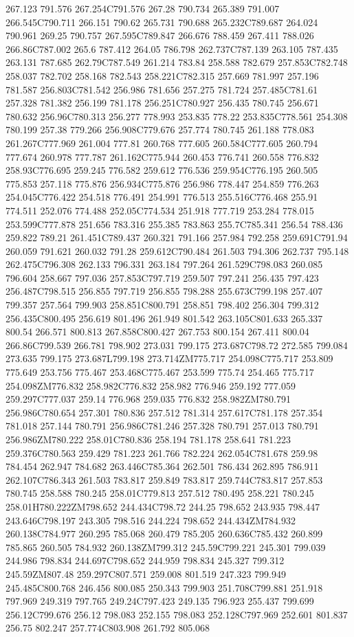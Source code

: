 267.123 791.576 267.254C791.576 267.28 790.734 265.389 791.007 266.545C790.711 266.151 790.62 265.731 790.688 265.232C789.687 264.024 790.961 269.25 790.757 267.595C789.847 266.676 788.459 267.411 788.026 266.86C787.002 265.6 787.412 264.05 786.798 262.737C787.139 263.105 787.435 263.131 787.685 262.79C787.549 261.214 783.84 258.588 782.679 257.853C782.748 258.037 782.702 258.168 782.543 258.221C782.315 257.669 781.997 257.196 781.587 256.803C781.542 256.986 781.656 257.275 781.724 257.485C781.61 257.328 781.382 256.199 781.178 256.251C780.927 256.435 780.745 256.671 780.632 256.96C780.313 256.277 778.993 253.835 778.22 253.835C778.561 254.308 780.199 257.38 779.266 256.908C779.676 257.774 780.745 261.188 778.083 261.267C777.969 261.004 777.81 260.768 777.605 260.584C777.605 260.794 777.674 260.978 777.787 261.162C775.944 260.453 776.741 260.558 776.832 258.93C776.695 259.245 776.582 259.612 776.536 259.954C776.195 260.505 775.853 257.118 775.876 256.934C775.876 256.986 778.447 254.859 776.263 254.045C776.422 254.518 776.491 254.991 776.513 255.516C776.468 255.91 774.511 252.076 774.488 252.05C774.534 251.918 777.719 253.284 778.015 253.599C777.878 251.656 783.316 255.385 783.863 255.7C785.341 256.54 788.436 259.822 789.21 261.451C789.437 260.321 791.166 257.984 792.258 259.691C791.94 260.059 791.621 260.032 791.28 259.612C790.484 261.503 794.306 262.737 795.148 262.475C796.308 262.133 796.331 263.184 797.264 261.529C798.083 260.085 796.604 258.667 797.036 257.853C797.719 259.507 797.241 256.435 797.423 256.487C798.515 256.855 797.719 256.855 798.288 255.673C799.198 257.407 799.357 257.564 799.903 258.851C800.791 258.851 798.402 256.304 799.312 256.435C800.495 256.619 801.496 261.949 801.542 263.105C801.633 265.337 800.54 266.571 800.813 267.858C800.427 267.753 800.154 267.411 800.04 266.86C799.539 266.781 798.902 273.031 799.175 273.687C798.72 272.585 799.084 273.635 799.175 273.687L799.198 273.714ZM775.717 254.098C775.717 253.809 775.649 253.756 775.467 253.468C775.467 253.599 775.74 254.465 775.717 254.098ZM776.832 258.982C776.832 258.982 776.946 259.192 777.059 259.297C777.037 259.14 776.968 259.035 776.832 258.982ZM780.791 256.986C780.654 257.301 780.836 257.512 781.314 257.617C781.178 257.354 781.018 257.144 780.791 256.986C781.246 257.328 780.791 257.013 780.791 256.986ZM780.222 258.01C780.836 258.194 781.178 258.641 781.223 259.376C780.563 259.429 781.223 261.766 782.224 262.054C781.678 259.98 784.454 262.947 784.682 263.446C785.364 262.501 786.434 262.895 786.911 262.107C786.343 261.503 783.817 259.849 783.817 259.744C783.817 257.853 780.745 258.588 780.245 258.01C779.813 257.512 780.495 258.221 780.245 258.01H780.222ZM798.652 244.434C798.72 244.25 798.652 243.935 798.447 243.646C798.197 243.305 798.516 244.224 798.652 244.434ZM784.932 260.138C784.977 260.295 785.068 260.479 785.205 260.636C785.432 260.899 785.865 260.505 784.932 260.138ZM799.312 245.59C799.221 245.301 799.039 244.986 798.834 244.697C798.652 244.959 798.834 245.327 799.312 245.59ZM807.48 259.297C807.571 259.008 801.519 247.323 799.949 245.485C800.768 246.456 800.085 250.343 799.903 251.708C799.881 251.918 797.969 249.319 797.765 249.24C797.423 249.135 796.923 255.437 799.699 256.12C799.676 256.12 798.083 252.155 798.083 252.128C797.969 252.601 801.837 256.75 802.247 257.774C803.908 261.792 805.068 